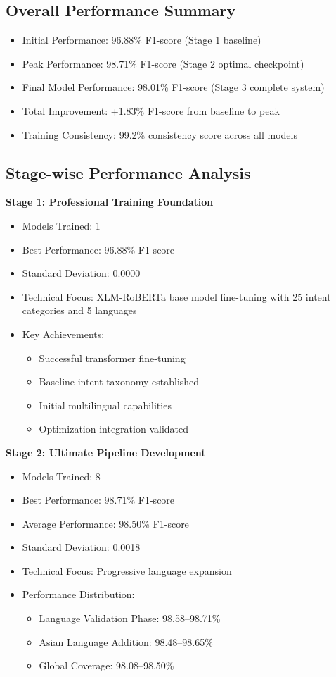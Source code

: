 \documentclass{ecai}
\begin{document}
\subsection{Overall Performance Summary}
\begin{itemize}
    \item Initial Performance: 96.88\% F1-score (Stage 1 baseline)
    \item Peak Performance: 98.71\% F1-score (Stage 2 optimal checkpoint)
    \item Final Model Performance: 98.01\% F1-score (Stage 3 complete system)
    \item Total Improvement: +1.83\% F1-score from baseline to peak
    \item Training Consistency: 99.2\% consistency score across all models
\end{itemize}

\subsection{Stage-wise Performance Analysis}

\textbf{Stage 1: Professional Training Foundation}
\begin{itemize}
    \item Models Trained: 1
    \item Best Performance: 96.88\% F1-score
    \item Standard Deviation: 0.0000
    \item Technical Focus: XLM-RoBERTa base model fine-tuning with 25 intent categories and 5 languages
    \item Key Achievements:
    \begin{itemize}
        \item Successful transformer fine-tuning
        \item Baseline intent taxonomy established
        \item Initial multilingual capabilities
        \item Optimization integration validated
    \end{itemize}
\end{itemize}

\textbf{Stage 2: Ultimate Pipeline Development}
\begin{itemize}
    \item Models Trained: 8
    \item Best Performance: 98.71\% F1-score
    \item Average Performance: 98.50\% F1-score
    \item Standard Deviation: 0.0018
    \item Technical Focus: Progressive language expansion
    \item Performance Distribution:
    \begin{itemize}
        \item Language Validation Phase: 98.58–98.71\%
        \item Asian Language Addition: 98.48–98.65\%
        \item Global Coverage: 98.08–98.50\%
    \end{itemize}
\end{itemize}
\end{document}
